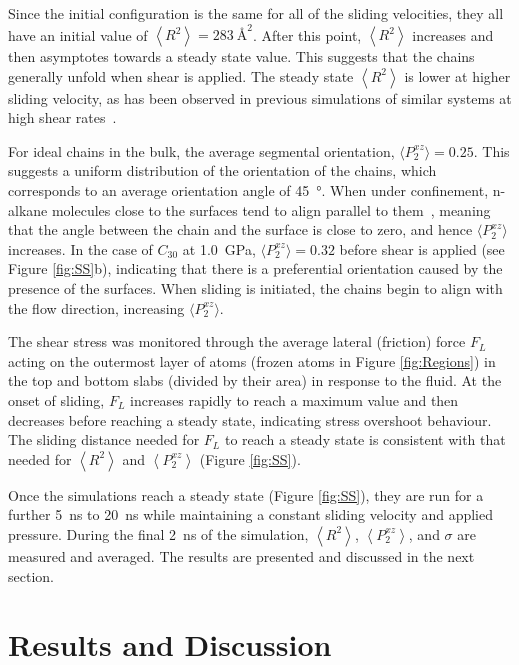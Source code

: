 \documentclass[5p]{elsarticle}
\begin{document}
Since the initial configuration is the same for all of the sliding velocities, they all have an initial value of $\left< R^2 \right> = \SI{283}{\angstrom\squared}$. After this point, $\left< R^2 \right> $ increases and then asymptotes towards a steady state value. This suggests that the chains generally unfold when shear is applied. The steady state $\left< R^2 \right>$ is lower at higher sliding velocity, as has been observed in previous simulations of similar systems at high shear rates~\cite{Cho2017}.

For ideal chains in the bulk, the average segmental orientation, $\langle P_{2}^{xz}\rangle=0.25$. This suggests a uniform distribution of the orientation of the chains, which corresponds to an average orientation angle of \SI{45}{\degree}. When under confinement, n-alkane molecules close to the surfaces tend to align parallel to them~\cite{Cho2017}, meaning that the angle between the chain and the surface is close to zero, and hence $\langle P_{2}^{xz}\rangle$ increases. In the case of $C_{30}$ at \SI{1.0}{\giga\pascal}, $\langle P_{2}^{xz}\rangle=0.32$ before shear is applied (see Figure \ref{fig:SS}b), indicating that there is a preferential orientation caused by the presence of the surfaces. When sliding is initiated, the chains begin to align with the flow direction, increasing $\langle P_{2}^{xz}\rangle$.

The shear stress was monitored through the average lateral (friction) force $F_L$ acting on the outermost layer of atoms (frozen atoms in Figure \ref{fig:Regions}) in the top and bottom slabs (divided by their area) in response to the fluid. At the onset of sliding, $F_L$ increases rapidly to reach a maximum value and then decreases before reaching a steady state, indicating stress overshoot behaviour\cite{Jeong2017}. The sliding distance needed for $F_L$ to reach a steady state is consistent with that needed for $\left< R^2 \right> $ and $\left<P_{2}^{xz} \right> $ (Figure \ref{fig:SS}).

Once the simulations reach a steady state (Figure \ref{fig:SS}), they are run for a further \SI{5}{\nano\second} to \SI{20}{\nano\second} while maintaining a constant sliding velocity and applied pressure. During the final \SI{2}{\nano\second} of the simulation, $\left< R^2 \right>$, $\left<P_{2}^{xz} \right> $, and $\sigma$ are measured and averaged. The results are presented and discussed in the next section.


\section{Results and Discussion}
\end{document}
